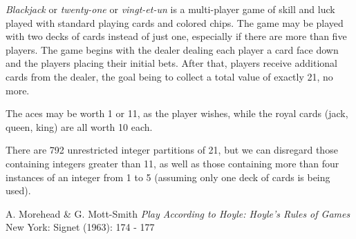 \documentclass[12pt]{article}
\begin{document}
{\em Blackjack} or {\em twenty-one} or {\em vingt-et-un} is a multi-player game of skill and luck played with standard playing cards and colored chips. The game may be played with two decks of cards instead of just one, especially if there are more than five players. The game begins with the dealer dealing each player a card face down and the players placing their initial bets. After that, players receive additional cards from the dealer, the goal being to collect a total value of exactly 21, no more.

The aces may be worth 1 or 11, as the player wishes, while the royal cards (jack, queen, king) are all worth 10 each.

There are 792 unrestricted integer partitions of 21, but we can disregard those containing integers greater than 11, as well as those containing more than four instances of an integer from 1 to 5 (assuming only one deck of cards is being used).

\begin{thebibliography}{1}
 A. Morehead \& G. Mott-Smith {\it Play According to Hoyle: Hoyle's Rules of Games} New York: Signet (1963): 174 - 177
\end{thebibliography}
\end{document}
